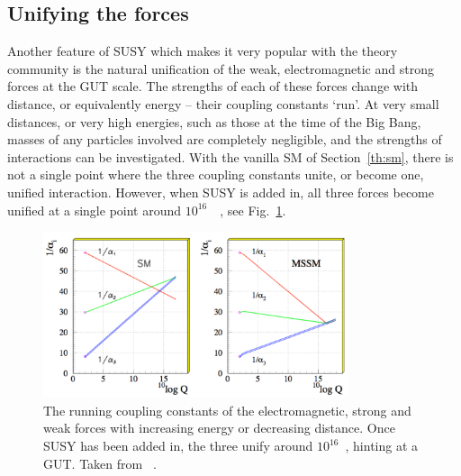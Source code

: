 
\subsection{Unifying the forces}

Another feature of \ac{SUSY} which makes it very popular with the theory community 
is the natural unification of the weak, electromagnetic and strong forces at the \ac{GUT} scale.
The strengths of each of these forces change with distance, or equivalently energy -- their coupling constants `run'. 
At very small distances, or very high energies, such as those at the time of the Big Bang, masses of any particles involved are completely negligible, and the strengths of interactions can be investigated.
With the vanilla \ac{SM} of Section~\ref{th:sm}, there is not a single point where the three coupling constants unite, or become one, unified interaction. 
However, when \ac{SUSY} is added in, all three forces become unified at a single point around $10^{16}$~\GeV~\cite{GUT}, see Fig.~\ref{fig:SUSgut}.

\begin{figure}[htbp]
  \begin{center}
  \includegraphics[width=0.8\textwidth]{Figures/theory/GUTunification}
  \caption{The running coupling constants of the electromagnetic, strong and weak forces with increasing energy or decreasing distance. Once \ac{SUSY} has been added in, the three unify around $10^{16}$~\GeV, hinting at a \ac{GUT}. Taken from ~\cite{GUTpic}.}
  \label{fig:SUSgut}
  \end{center}
\end{figure}

